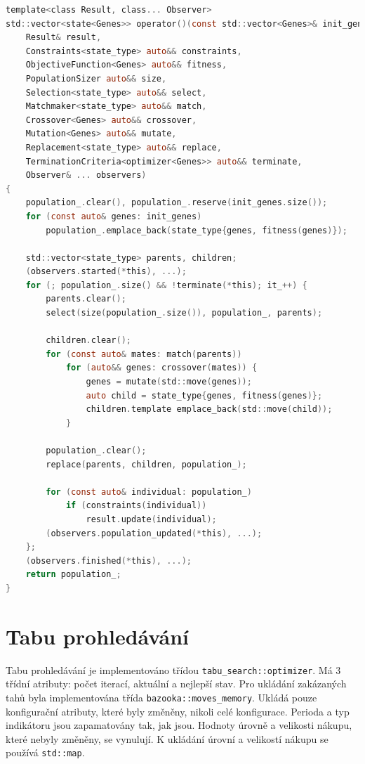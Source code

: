 \begin{lstlisting}[caption={~Implementace genetického algoritmu},label={lst:genetic:algorithm},captionpos=t,abovecaptionskip=-\medskipamount,belowcaptionskip=\medskipamount,language=C]
template<class Result, class... Observer>
std::vector<state<Genes>> operator()(const std::vector<Genes>& init_genes,
    Result& result,
    Constraints<state_type> auto&& constraints,
    ObjectiveFunction<Genes> auto&& fitness,
    PopulationSizer auto&& size,
    Selection<state_type> auto&& select,
    Matchmaker<state_type> auto&& match,
    Crossover<Genes> auto&& crossover,
    Mutation<Genes> auto&& mutate,
    Replacement<state_type> auto&& replace,
    TerminationCriteria<optimizer<Genes>> auto&& terminate,
    Observer& ... observers)
{
    population_.clear(), population_.reserve(init_genes.size());
    for (const auto& genes: init_genes)
        population_.emplace_back(state_type{genes, fitness(genes)});

    std::vector<state_type> parents, children;
    (observers.started(*this), ...);
    for (; population_.size() && !terminate(*this); it_++) {
        parents.clear();
        select(size(population_.size()), population_, parents);

        children.clear();
        for (const auto& mates: match(parents))
            for (auto&& genes: crossover(mates)) {
                genes = mutate(std::move(genes));
                auto child = state_type{genes, fitness(genes)};
                children.template emplace_back(std::move(child));
            }

        population_.clear();
        replace(parents, children, population_);

        for (const auto& individual: population_)
            if (constraints(individual))
                result.update(individual);
        (observers.population_updated(*this), ...);
    };
    (observers.finished(*this), ...);
    return population_;
}
\end{lstlisting}

\section{Tabu prohledávání}
Tabu prohledávání je implementováno třídou \texttt{tabu\_search::optimizer}.
Má 3 třídní atributy: počet iterací, aktuální a nejlepší stav.
Pro ukládání zakázaných tahů byla implementována třída \texttt{bazooka::moves\_memory}.
Ukládá pouze konfigurační atributy, které byly změněny, nikoli celé konfigurace.
Perioda a typ indikátoru jsou zapamatovány tak, jak jsou.
Hodnoty úrovně a velikosti nákupu, které nebyly změněny, se vynulují.
K ukládání úrovní a velikostí nákupu se používá \texttt{std::map}.

